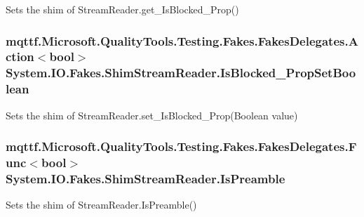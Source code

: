 Sets the shim of Stream\-Reader.\-get\-\_\-\-Is\-Blocked\-\_\-\-Prop()

\hypertarget{class_system_1_1_i_o_1_1_fakes_1_1_shim_stream_reader_af3993cd08149f6975be4ff55a32d1a76}{
\subsubsection[{Is\-Blocked\-\_\-\-Prop\-Set\-Boolean}]{\setlength{\rightskip}{0pt plus 5cm}mqttf.\-Microsoft.\-Quality\-Tools.\-Testing.\-Fakes.\-Fakes\-Delegates.\-Action$<$bool$>$ System.\-I\-O.\-Fakes.\-Shim\-Stream\-Reader.\-Is\-Blocked\-\_\-\-Prop\-Set\-Boolean\hspace{0.3cm}{\ttfamily [set]}}}\label{class_system_1_1_i_o_1_1_fakes_1_1_shim_stream_reader_af3993cd08149f6975be4ff55a32d1a76}


Sets the shim of Stream\-Reader.\-set\-\_\-\-Is\-Blocked\-\_\-\-Prop(\-Boolean value)

\hypertarget{class_system_1_1_i_o_1_1_fakes_1_1_shim_stream_reader_af5573d5de54382440ac6dd7009be90b1}{
\subsubsection[{Is\-Preamble}]{\setlength{\rightskip}{0pt plus 5cm}mqttf.\-Microsoft.\-Quality\-Tools.\-Testing.\-Fakes.\-Fakes\-Delegates.\-Func$<$bool$>$ System.\-I\-O.\-Fakes.\-Shim\-Stream\-Reader.\-Is\-Preamble\hspace{0.3cm}{\ttfamily [set]}}}\label{class_system_1_1_i_o_1_1_fakes_1_1_shim_stream_reader_af5573d5de54382440ac6dd7009be90b1}


Sets the shim of Stream\-Reader.\-Is\-Preamble()

